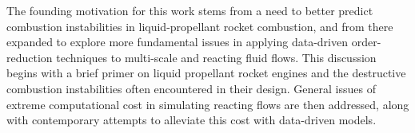The founding motivation for this work stems from a need to better predict combustion instabilities in liquid-propellant rocket combustion, and from there expanded to explore more fundamental issues in applying data-driven order-reduction techniques to multi-scale and reacting fluid flows. This discussion begins with a brief primer on liquid propellant rocket engines and the destructive combustion instabilities often encountered in their design. General issues of extreme computational cost in simulating reacting flows are then addressed, along with contemporary attempts to alleviate this cost with data-driven models.
